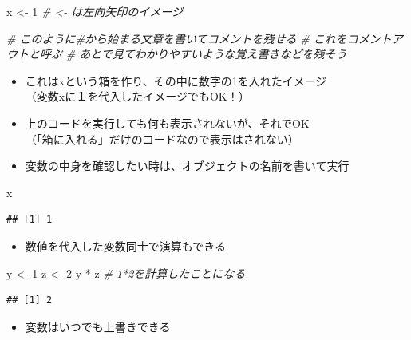 \documentclass[
]{book}
\newenvironment{Shaded}{\begin{snugshade}}{\end{snugshade}}
\newcommand{\CommentTok}[1]{\textcolor[rgb]{0.56,0.35,0.01}{\textit{#1}}}
\newcommand{\DecValTok}[1]{\textcolor[rgb]{0.00,0.00,0.81}{#1}}
\newcommand{\NormalTok}[1]{#1}
\newcommand{\OtherTok}[1]{\textcolor[rgb]{0.56,0.35,0.01}{#1}}
\newcommand{\SpecialCharTok}[1]{\textcolor[rgb]{0.00,0.00,0.00}{#1}}
\providecommand{\tightlist}{%
  \setlength{\itemsep}{0pt}\setlength{\parskip}{0pt}}
\begin{document}
\begin{Shaded}
\begin{Highlighting}[]
\NormalTok{x }\OtherTok{\textless{}{-}} \DecValTok{1} \CommentTok{\# \textless{}{-} は左向矢印のイメージ}

\CommentTok{\# このように\#から始まる文章を書いてコメントを残せる}
\CommentTok{\# これをコメントアウトと呼ぶ}
\CommentTok{\# あとで見てわかりやすいような覚え書きなどを残そう}
\end{Highlighting}
\end{Shaded}

\begin{itemize}
\tightlist
\item
  これはxという箱を作り、その中に数字の1を入れたイメージ\\
  （変数xに１を代入したイメージでもOK！）
\item
  上のコードを実行しても何も表示されないが、それでOK\\
  （「箱に入れる」だけのコードなので表示はされない）
\item
  変数の中身を確認したい時は、オブジェクトの名前を書いて実行
\end{itemize}

\begin{Shaded}
\begin{Highlighting}[]
\NormalTok{x}
\end{Highlighting}
\end{Shaded}

\begin{verbatim}
## [1] 1
\end{verbatim}

\begin{itemize}
\tightlist
\item
  数値を代入した変数同士で演算もできる
\end{itemize}

\begin{Shaded}
\begin{Highlighting}[]
\NormalTok{y }\OtherTok{\textless{}{-}} \DecValTok{1} 
\NormalTok{z }\OtherTok{\textless{}{-}} \DecValTok{2}
\NormalTok{y }\SpecialCharTok{*}\NormalTok{ z }\CommentTok{\# 1*2を計算したことになる}
\end{Highlighting}
\end{Shaded}

\begin{verbatim}
## [1] 2
\end{verbatim}

\begin{itemize}
\tightlist
\item
  変数はいつでも上書きできる
\end{itemize}
\end{document}

